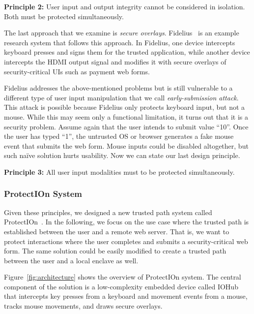 \documentclass[letterpaper,twocolumn,10pt]{article}
\newcommand{\protection}{\textsf{ProtectIOn}\xspace}
\newcommand{\hub}{\textsf{IOHub}\xspace}
\begin{document}
\begin{tcolorbox}
\textbf{Principle 2:} User input and output integrity cannot be considered in isolation. Both must be protected simultaneously.
\end{tcolorbox}

The last approach that we examine is \emph{secure overlays}. Fidelius~\cite{Fidelius} is an example research system that follows this approach. In Fidelius, one device intercepts keyboard presses and signs them for the trusted application, while another device intercepts the HDMI output signal and modifies it with secure overlays of security-critical UIs such as payment web forms. 

Fidelius addresses the above-mentioned problems but is still vulnerable to a different type of user input manipulation that we call \emph{early-submission attack}. This attack is possible because Fidelius only protects keyboard input, but not a mouse. While this may seem only a functional limitation, it turns out that it is a security problem. Assume again that the user intends to submit value ``10''. Once the user has typed ``1'', the untrusted OS or browser generates a fake mouse event that submits the web form. Mouse inputs could be disabled altogether, but such na\"ive solution hurts usability. Now we can state our last design principle.

\begin{tcolorbox}
\textbf{Principle 3:} All user input modalities must to be protected simultaneously.
\end{tcolorbox}


\subsubsection*{\protection System}

Given these principles, we designed a new trusted path system called \protection~\cite{protection}. In the following, we focus on the use case where the trusted path is established between the user and a remote web server. That is, we want to protect interactions where the user completes and submits a security-critical web form. The same solution could be easily modified to create a trusted path between the user and a local enclave as well.

Figure~\ref{fig:architecture} shows the overview of \protection system. The central component of the solution is a low-complexity embedded device called \hub that intercepts key presses from a keyboard and movement events from a mouse, tracks mouse movements, and draws secure overlays. 
\end{document}

